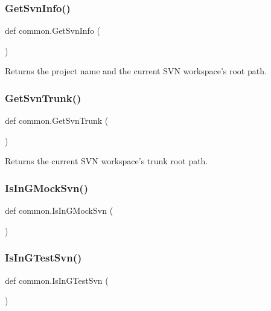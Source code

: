 \subsubsection{\texorpdfstring{Get\+Svn\+Info()}{GetSvnInfo()}}
{\footnotesize\ttfamily def common.\+Get\+Svn\+Info (\begin{DoxyParamCaption}{ }\end{DoxyParamCaption})}

\begin{DoxyVerb}Returns the project name and the current SVN workspace's root path.\end{DoxyVerb}
 \mbox{\label{namespacecommon_a9e6483972a8dc0a6a274cbcee69564b0}} 
\subsubsection{\texorpdfstring{Get\+Svn\+Trunk()}{GetSvnTrunk()}}
{\footnotesize\ttfamily def common.\+Get\+Svn\+Trunk (\begin{DoxyParamCaption}{ }\end{DoxyParamCaption})}

\begin{DoxyVerb}Returns the current SVN workspace's trunk root path.\end{DoxyVerb}
 \mbox{\label{namespacecommon_a8219bb529336fc3f0ef8222a5ed48222}} 
\subsubsection{\texorpdfstring{Is\+In\+G\+Mock\+Svn()}{IsInGMockSvn()}}
{\footnotesize\ttfamily def common.\+Is\+In\+G\+Mock\+Svn (\begin{DoxyParamCaption}{ }\end{DoxyParamCaption})}

\mbox{\label{namespacecommon_af29dcab2d7b4a9dd846446a0987ab387}} 
\subsubsection{\texorpdfstring{Is\+In\+G\+Test\+Svn()}{IsInGTestSvn()}}
{\footnotesize\ttfamily def common.\+Is\+In\+G\+Test\+Svn (\begin{DoxyParamCaption}{ }\end{DoxyParamCaption})}

